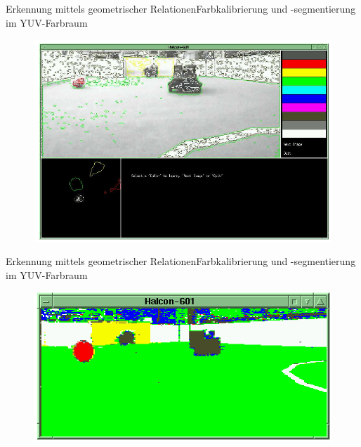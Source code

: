 \documentclass{beamer}
\begin{document}
\begin{frame}{Erkennung mittels geometrischer Relationen}{Farbkalibrierung und -segmentierung im YUV-Farbraum}
\begin{figure}[htp]
\centering
\includegraphics[scale=0.4]{training-tool.png}
\end{figure}
\end{frame}

\begin{frame}{Erkennung mittels geometrischer Relationen}{Farbkalibrierung und -segmentierung im YUV-Farbraum}
\begin{figure}[htp]
\centering
\includegraphics[scale=0.5]{segmented-view.png}
\end{figure}
\end{frame}
\end{document}
